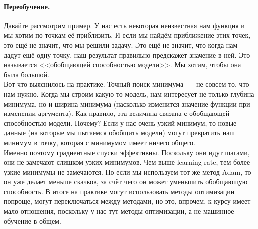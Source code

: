 \documentclass{article}
\begin{document}
    \paragraph{Переобучение.}
    Давайте рассмотрим пример. У нас есть некоторая неизвестная нам функция и мы хотим по точкам её приблизить. И если мы найдём приближение этих точек, это ещё не значит, что мы решили задачу. Это ещё не значит, что когда нам дадут ещё одну точку, наш результат правильно предскажет значение в ней. Это называется <<обобщающей способностью модели>>. Мы хотим, чтобы она была большой.\\
    Вот что выяснилось на практике. Точный поиск минимума~--- не совсем то, что нам нужно. Когда мы строим какую-то модель, нам интересует не только глубина минимума, но и ширина минимума (насколько изменится значение функции при изменении аргумента). Как правило, эта величина связана с обобщающей способностью модели. Почему? Если у нас очень узкий минимум, то новые данные (на которые мы пытаемся обобщить модели) могут превратить наш минимум в точку, которая с минимумом имеет ничего общего.\\
    Именно поэтому градиентные спуски эффективны. Поскольку они идут шагами, они не замечают слишком узких минимумов. Чем выше learning rate, тем более узкие минимумы не замечаются. Но если мы используем тот же метод Adam, то он уже делает меньше скачков, за счёт чего он может уменьшить обобщающую способность. В итоге на практике могут использовать методы оптимизации попроще, могут переключаться между методами, но это, впрочем, к курсу имеет мало отношения, поскольку у нас тут методы оптимизации, а не машинное обучение в общем.
\end{document}
